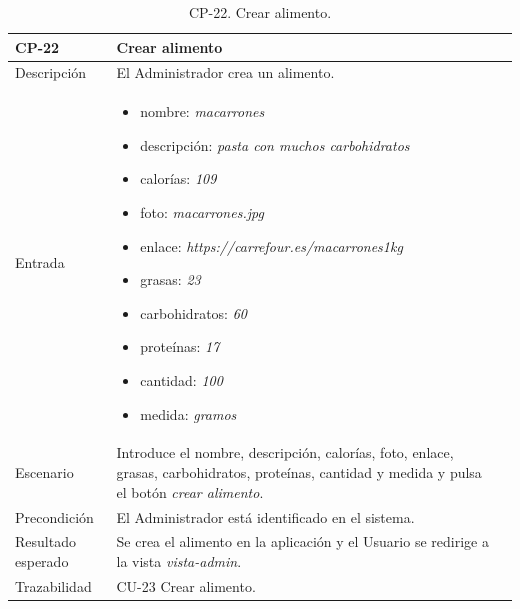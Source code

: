             \begin{table}[H]
                \centering
                \begin{tabularx}{1\textwidth} { 
                    | >{\raggedright\arraybackslash}X 
                    | >{\raggedright\arraybackslash}X 
                    | >{\raggedright\arraybackslash}X 
                    |  }
                \hline
                \textbf{CP-22}     & \textbf{Crear alimento}                             \\ \hline
                Descripción        & El Administrador crea un alimento.      \\ \hline
                Entrada            & \begin{itemize}
                    \item nombre: \textit{macarrones}
                    \item descripción: \textit{pasta con muchos carbohidratos}
                    \item calorías: \textit{109}
                    \item foto: \textit{macarrones.jpg}
                    \item enlace: \textit{https://carrefour.es/macarrones1kg}
                    \item grasas: \textit{23}
                    \item carbohidratos: \textit{60}
                    \item proteínas: \textit{17}
                    \item cantidad: \textit{100}
                    \item medida: \textit{gramos}
                \end{itemize}\\ \hline
                Escenario          & Introduce el nombre, descripción, calorías, foto, enlace, grasas, carbohidratos, proteínas, cantidad y medida y pulsa el botón \textit{crear alimento}.                            \\ \hline
                Precondición          & El Administrador está identificado en el sistema.                             \\ \hline
               
                Resultado esperado & Se crea el alimento en la aplicación y el Usuario se redirige a la vista \textit{vista-admin}. \\ \hline
                Trazabilidad & CU-23 Crear alimento.\\ \hline
            \end{tabularx}
            \caption{CP-22. Crear alimento.}
            \label{table:CP-22}
                \end{table}


